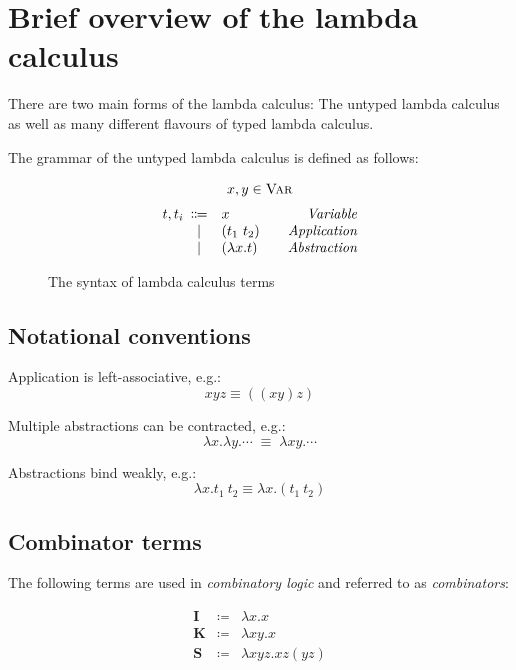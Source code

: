 \section{Brief overview of the lambda calculus}

There are two main forms of the lambda calculus: The untyped lambda calculus
as well as many different flavours of typed lambda calculus.

The grammar of the untyped lambda calculus is defined as follows:

\begin{figure}[htbp]
  \[
  \begin{array}{r@{\hspace{.5em}}cl@{\hspace{2em}}r}
    \multicolumn{4}{c}{x,y \in \textsc{Var}}\\[2mm]
    t, t_i & \Coloneqq & x & \emph{Variable} \\
    & | & (t_1\ t_2) & \emph{Application} \\
    & | & (\lambda x. t) & \emph{Abstraction}
  \end{array}
  \]
  \caption{The syntax of lambda calculus terms}
  \label{fig:lambda-calculus-grammar}
\end{figure}

\subsection{Notational conventions}
Application is left-associative, e.g.:
\[ xyz \equiv ((x y) z) \]

Multiple abstractions can be contracted, e.g.:
\[ \lambda x. \lambda y. \cdots \;\equiv\; \lambda x y. \cdots \]


Abstractions bind weakly, e.g.:
\[ \lambda x. t_1\ t_2 \equiv \lambda x. (t_1\ t_2) \]

\subsection{Combinator terms}
The following terms are used in \emph{combinatory logic} and referred to as
\emph{combinators}:

\[
\begin{array}{ccl}
  \mathbf{I} &\coloneqq& \lambda x. x \\
  \mathbf{K} &\coloneqq& \lambda x y. x \\
  \mathbf{S} &\coloneqq& \lambda x y z. x z (y z)
\end{array}
\]


